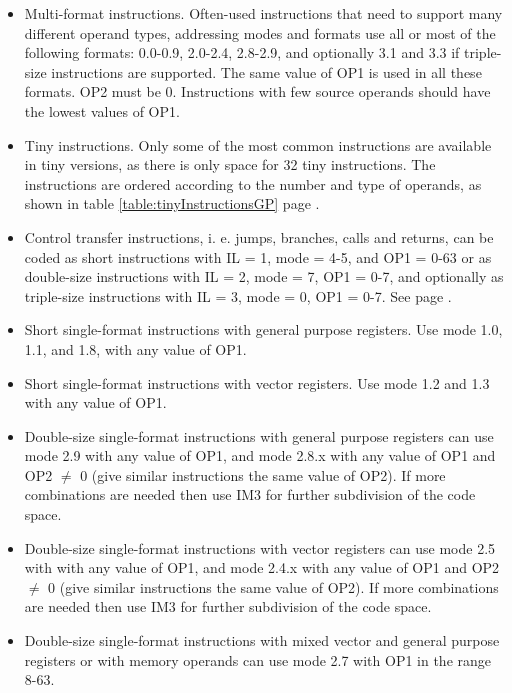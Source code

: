 \documentclass[forwardcom.tex]{subfiles}
\begin{document}
\begin{itemize}
\item Multi-format instructions. Often-used instructions that need to support many different operand types, addressing modes and formats use all or most of the following formats: 0.0-0.9, 2.0-2.4, 2.8-2.9, and optionally 3.1 and 3.3 if triple-size instructions are supported. The same value of OP1 is used in all these formats. OP2 must be 0. Instructions with few source operands should have the lowest values of OP1.

\item Tiny instructions. Only some of the most common instructions are available in tiny versions, as there is only space for 32 tiny instructions. The instructions are ordered according to the number and type of operands, as shown in table \ref{table:tinyInstructionsGP} page \pageref{table:tinyInstructionsGP}.

\item Control transfer instructions, i. e. jumps, branches, calls and returns, can be coded as short instructions with IL = 1, mode = 4-5, and OP1 = 0-63 or as double-size instructions with IL = 2, mode = 7, OP1 = 0-7, and optionally as triple-size instructions with IL = 3, mode = 0, OP1 = 0-7. See page \pageref{table:jumpInstructionFormats}.

\item Short single-format instructions with general purpose registers. Use mode 1.0, 1.1, and 1.8, with  any value of OP1.

\item Short single-format instructions with vector registers. Use mode 1.2 and 1.3
with any value of OP1.

\item Double-size single-format instructions with general purpose registers can use mode 2.9 with any value of OP1, and mode 2.8.x with any value of OP1 and OP2 $\neq$ 0 (give similar instructions the same value of OP2). If more combinations are needed then use IM3 for further subdivision of the code space.

\item Double-size single-format instructions with vector registers can use mode 2.5 with with any value of OP1, and mode 2.4.x with any value of OP1 and OP2 $\neq$ 0 (give similar instructions the same value of OP2). If more combinations are needed then use IM3 for further subdivision of the code space.

\item Double-size single-format instructions with mixed vector and general purpose registers or with memory operands can use mode 2.7 with OP1 in the range 8-63.


\end{itemize}
\end{document}
